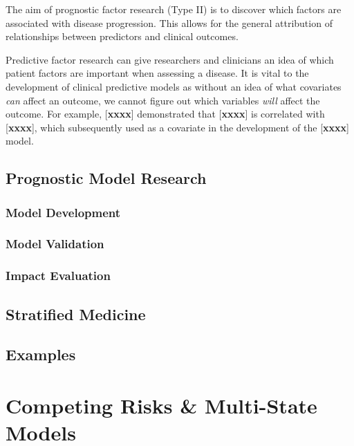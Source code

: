 \documentclass[12pt,twoside]{reedthesis}
\begin{document}
The aim of prognostic factor research (Type II) is to discover which factors are associated with disease progression. This allows for the general attribution of relationships between predictors and clinical outcomes.

Predictive factor research can give researchers and clinicians an idea of which patient factors are important when assessing a disease. It is vital to the development of clinical predictive models as without an idea of what covariates \emph{can} affect an outcome, we cannot figure out which variables \emph{will} affect the outcome. For example, {[}\textbf{xxxx}{]} demonstrated that {[}\textbf{xxxx}{]} is correlated with {[}\textbf{xxxx}{]}, which subsequently used as a covariate in the development of the {[}\textbf{xxxx}{]} model.

\hypertarget{prognostic-model-research}{%
\subsection{Prognostic Model Research}\label{prognostic-model-research}}

\hypertarget{model-development}{%
\subsubsection{Model Development}\label{model-development}}

\hypertarget{model-validation}{%
\subsubsection{Model Validation}\label{model-validation}}

\hypertarget{impact-evaluation}{%
\subsubsection{Impact Evaluation}\label{impact-evaluation}}

\hypertarget{stratified-medicine}{%
\subsection{Stratified Medicine}\label{stratified-medicine}}

\hypertarget{examples}{%
\subsection{Examples}\label{examples}}

\hypertarget{competing-risks-multi-state-models}{%
\section{Competing Risks \& Multi-State Models}\label{competing-risks-multi-state-models}}
\end{document}
